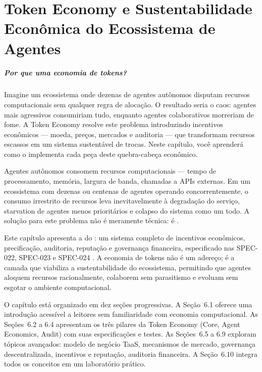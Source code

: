 \chapter{Token Economy e Sustentabilidade Econômica do Ecossistema de Agentes}
\label{cap:token-economy}

\paragraph{Por que uma economia de tokens?} Imagine um ecossistema onde dezenas de agentes autônomos disputam recursos computacionais sem qualquer regra de alocação. O resultado seria o caos: agentes mais agressivos consumiriam tudo, enquanto agentes colaborativos morreriam de fome. A Token Economy resolve este problema introduzindo incentivos econômicos --- moeda, preços, mercados e auditoria --- que transformam recursos escassos em um sistema sustentável de trocas. Neste capítulo, você aprenderá como o \opencodeeco{} implementa cada peça deste quebra-cabeça econômico.

Agentes autônomos consomem recursos computacionais — tempo de
processamento, memória, largura de banda, chamadas a APIs externas.
Em um ecossistema com dezenas ou centenas de agentes operando
concorrentemente, o consumo irrestrito de recursos leva
inevitavelmente à degradação do serviço, starvation de agentes menos
prioritários e colapso do sistema como um todo. A solução para este
problema não é meramente técnica: é .

Este capítulo apresenta a  do \opencodeeco{}:
um sistema completo de incentivos econômicos, precificação,
auditoria, reputação e governança financeira, especificado nas
SPEC-022, SPEC-023 e SPEC-024 \cite{opencode2026token}. A economia
de tokens não é um adereço; é a camada que viabiliza a
sustentabilidade do ecossistema, permitindo que agentes aloquem
recursos racionalmente, colaborem sem parasitismo e evoluam sem
esgotar o ambiente computacional.

O capítulo está organizado em dez seções progressivas. A
Seção~6.1 oferece uma introdução acessível a leitores sem
familiaridade com economia computacional. As Seções~6.2 a 6.4
apresentam os três pilares da Token Economy (Core, Agent Economics,
Audit) com suas especificações e testes. As Seções~6.5 a 6.9
exploram tópicos avançados: modelo de negócio TaaS, mecanismos de
mercado, governança descentralizada, incentivos e reputação,
auditoria financeira. A Seção~6.10 integra todos os conceitos em
um laboratório prático.

